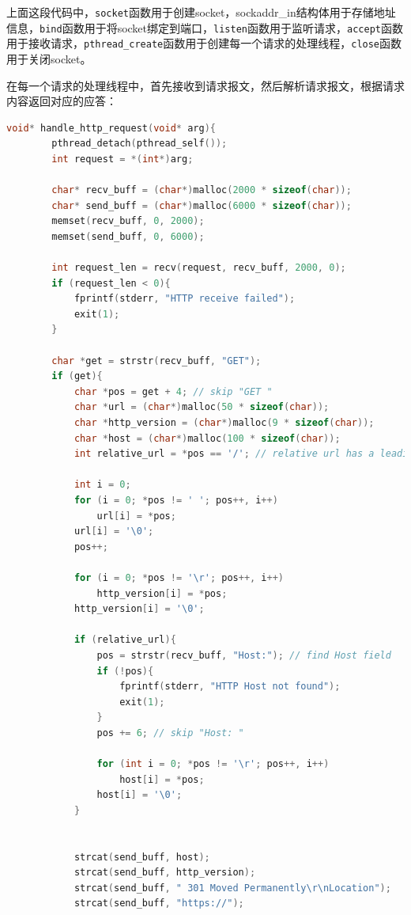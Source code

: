 \documentclass[UTF8]{article}
\begin{document}
上面这段代码中，\texttt{socket}函数用于创建socket，sockaddr_in结构体用于存储地址信息，\texttt{bind}函数用于将socket绑定到端口，\texttt{listen}函数用于监听请求，\texttt{accept}函数用于接收请求，\texttt{pthread\_create}函数用于创建每一个请求的处理线程，\texttt{close}函数用于关闭socket。


在每一个请求的处理线程中，首先接收到请求报文，然后解析请求报文，根据请求内容返回对应的应答：

\begin{lstlisting}[language=c]
    void* handle_http_request(void* arg){
        pthread_detach(pthread_self());
        int request = *(int*)arg;
    
        char* recv_buff = (char*)malloc(2000 * sizeof(char));
        char* send_buff = (char*)malloc(6000 * sizeof(char));
        memset(recv_buff, 0, 2000);
        memset(send_buff, 0, 6000);
    
        int request_len = recv(request, recv_buff, 2000, 0);
        if (request_len < 0){
            fprintf(stderr, "HTTP receive failed");
            exit(1);
        }
    
        char *get = strstr(recv_buff, "GET");
        if (get){
            char *pos = get + 4; // skip "GET "
            char *url = (char*)malloc(50 * sizeof(char));
            char *http_version = (char*)malloc(9 * sizeof(char));
            char *host = (char*)malloc(100 * sizeof(char));
            int relative_url = *pos == '/'; // relative url has a leading '/'
    
            int i = 0;
            for (i = 0; *pos != ' '; pos++, i++)
                url[i] = *pos;
            url[i] = '\0';
            pos++;
    
            for (i = 0; *pos != '\r'; pos++, i++)
                http_version[i] = *pos;
            http_version[i] = '\0';
    
            if (relative_url){
                pos = strstr(recv_buff, "Host:"); // find Host field
                if (!pos){
                    fprintf(stderr, "HTTP Host not found");
                    exit(1);
                }
                pos += 6; // skip "Host: "
    
                for (int i = 0; *pos != '\r'; pos++, i++)
                    host[i] = *pos;
                host[i] = '\0';
            }
    
    
            strcat(send_buff, host);
            strcat(send_buff, http_version);
            strcat(send_buff, " 301 Moved Permanently\r\nLocation");
            strcat(send_buff, "https://");
    

\end{lstlisting}
\end{document}
